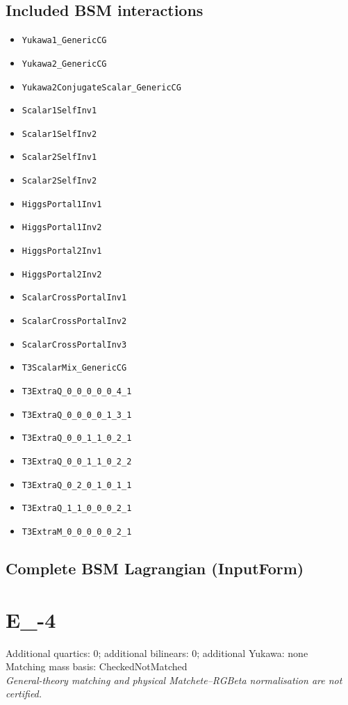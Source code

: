 \documentclass[10pt,a4paper]{article}
\begin{document}
\subsection*{Included BSM interactions}
\begin{itemize}
\item \texttt{Yukawa1\_GenericCG}
\item \texttt{Yukawa2\_GenericCG}
\item \texttt{Yukawa2ConjugateScalar\_GenericCG}
\item \texttt{Scalar1SelfInv1}
\item \texttt{Scalar1SelfInv2}
\item \texttt{Scalar2SelfInv1}
\item \texttt{Scalar2SelfInv2}
\item \texttt{HiggsPortal1Inv1}
\item \texttt{HiggsPortal1Inv2}
\item \texttt{HiggsPortal2Inv1}
\item \texttt{HiggsPortal2Inv2}
\item \texttt{ScalarCrossPortalInv1}
\item \texttt{ScalarCrossPortalInv2}
\item \texttt{ScalarCrossPortalInv3}
\item \texttt{T3ScalarMix\_GenericCG}
\item \texttt{T3ExtraQ\_0\_0\_0\_0\_0\_4\_1}
\item \texttt{T3ExtraQ\_0\_0\_0\_0\_1\_3\_1}
\item \texttt{T3ExtraQ\_0\_0\_1\_1\_0\_2\_1}
\item \texttt{T3ExtraQ\_0\_0\_1\_1\_0\_2\_2}
\item \texttt{T3ExtraQ\_0\_2\_0\_1\_0\_1\_1}
\item \texttt{T3ExtraQ\_1\_1\_0\_0\_0\_2\_1}
\item \texttt{T3ExtraM\_0\_0\_0\_0\_0\_2\_1}
\end{itemize}
\subsection*{Complete BSM Lagrangian (InputForm)}

\clearpage
\section{E\_-4}
Additional quartics: 0; additional bilinears: 0; additional Yukawa: none\\
Matching mass basis: CheckedNotMatched\\
\emph{General-theory matching and physical Matchete--RGBeta normalisation are not certified.}
\end{document}
